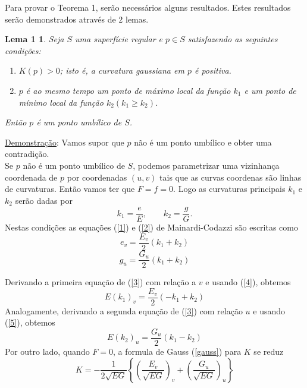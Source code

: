 \documentclass[blue]{beamer}
\newtheorem{lem}{Lema 1}
\begin{document}
\begin{frame}
\justify
\hspace{0.2cm}Para provar o Teorema 1, serão necessários alguns resultados. Estes resultados serão demonstrados através de 2 lemas.
\begin{lem}
	\justify
	 \hspace{0.2cm}Seja $S$ uma superfície regular e $p \in S$ satisfazendo as seguintes condições:
	 \begin{enumerate}
	 	\item $K(p) > 0$; isto é, a curvatura gaussiana em $p$ é positiva.
	 	\item $p$ é ao mesmo tempo um ponto de máximo local da função $k_1$ e um ponto de mínimo local da função $k_2 (k_1 \geq k_2)$.
	 \end{enumerate}
     \hspace{0.2cm}Então $p$ é um ponto umbílico de $S$. 
\end{lem}
\end{frame}

\begin{frame}
\justifying
\underline{Demonstração}: Vamos supor que $p$ não é um ponto umbílico e obter uma contradição.\\
Se $p$ não é um ponto umbílico de $S$, podemos parametrizar uma vizinhança coordenada de $p$ por coordenadas $(u,v)$ tais que as curvas coordenas são linhas de curvaturas. Então vamos ter que $F = f = 0$. Logo as curvaturas principais $k_1$ e $k_2$ serão dadas por 
\begin{equation}
k_1=\frac{e}{E}, \quad \quad k_2=\frac{g}{G}. \label{3}
\end{equation}
\hspace{0.2cm}Nestas condições as equações (\ref{1}) e (\ref{2}) de Mainardi-Codazzi são escritas como
\begin{equation}
e_v=\frac{E_v}{2}(k_1+k_2) \label{4}
\end{equation}
\begin{equation}
g_u=\frac{G_u}{2}(k_1+k_2) \label{5}
\end{equation}

\end{frame}

\begin{frame}
\justifying
\hspace{0.2cm}Derivando a primeira equação de (\ref{3}) com relação a $v$ e usando (\ref{4}), obtemos
\begin{equation}
E(k_1)_v=\frac{E_v}{2}(-k_1+k_2) \label{6}
\end{equation}
\hspace{0.2cm}Analogamente, derivando a segunda equação de (\ref{3}) com relação $u$ e usando (\ref{5}), obtemos
\begin{equation}
E(k_2)_u=\frac{G_u}{2}(k_1-k_2) \label{7}
\end{equation}
\hspace{0.2cm}Por outro lado, quando $F = 0$, a formula de Gauss (\ref{gauss}) para $K$ se reduz
$$
K=-\frac{1}{2\sqrt{EG}}\left\{\left(\frac{E_v}{\sqrt{EG}}\right)_v+\left(\frac{G_u}{\sqrt{EG}}\right)_u \right\}
$$
\end{frame}
\end{document}
